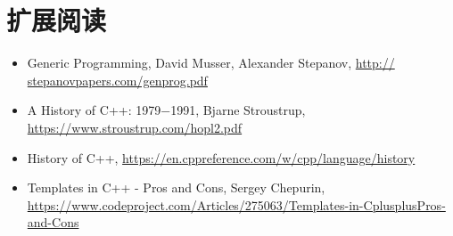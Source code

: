 \section{扩展阅读}
\begin{itemize}
\item
Generic Programming, David Musser, Alexander Stepanov, \url{http:// stepanovpapers.com/genprog.pdf}

\item
A History of C++: 1979−1991, Bjarne Stroustrup, \url{https://www.stroustrup.com/hopl2.pdf}

\item
History of C++, \url{https://en.cppreference.com/w/cpp/language/history}

\item
Templates in C++ - Pros and Cons, Sergey Chepurin, \url{https://www.codeproject.com/Articles/275063/Templates-in-CplusplusPros-and-Cons}
\end{itemize}